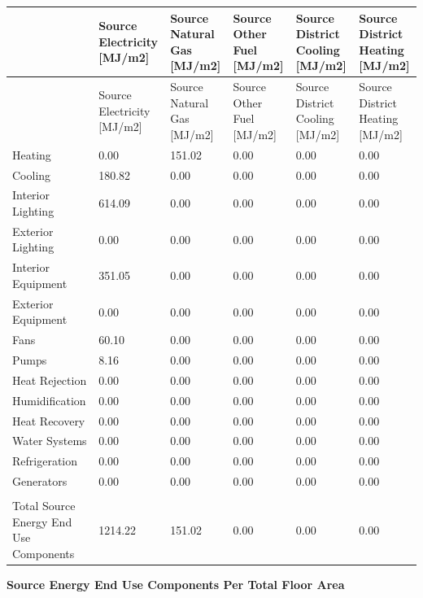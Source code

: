 \begin{longtable}[c]{>{\raggedright}p{1.0in}>{\raggedright}p{1.0in}>{\raggedright}p{1.0in}>{\raggedright}p{1.0in}>{\raggedright}p{1.0in}>{\raggedright}p{1.0in}}
\toprule
 & Source Electricity [MJ/m2] & Source Natural Gas [MJ/m2] & Source Other Fuel [MJ/m2] & Source District Cooling [MJ/m2] & Source District Heating [MJ/m2] \tabularnewline
\midrule
\endfirsthead

\toprule
 & Source Electricity [MJ/m2] & Source Natural Gas [MJ/m2] & Source Other Fuel [MJ/m2] & Source District Cooling [MJ/m2] & Source District Heating [MJ/m2] \tabularnewline
\midrule
\endhead

Heating & 0.00 & 151.02 & 0.00 & 0.00 & 0.00 \tabularnewline
Cooling & 180.82 & 0.00 & 0.00 & 0.00 & 0.00 \tabularnewline
Interior Lighting & 614.09 & 0.00 & 0.00 & 0.00 & 0.00 \tabularnewline
Exterior Lighting & 0.00 & 0.00 & 0.00 & 0.00 & 0.00 \tabularnewline
Interior Equipment & 351.05 & 0.00 & 0.00 & 0.00 & 0.00 \tabularnewline
Exterior Equipment & 0.00 & 0.00 & 0.00 & 0.00 & 0.00 \tabularnewline
Fans & 60.10 & 0.00 & 0.00 & 0.00 & 0.00 \tabularnewline
Pumps & 8.16 & 0.00 & 0.00 & 0.00 & 0.00 \tabularnewline
Heat Rejection & 0.00 & 0.00 & 0.00 & 0.00 & 0.00 \tabularnewline
Humidification & 0.00 & 0.00 & 0.00 & 0.00 & 0.00 \tabularnewline
Heat Recovery & 0.00 & 0.00 & 0.00 & 0.00 & 0.00 \tabularnewline
Water Systems & 0.00 & 0.00 & 0.00 & 0.00 & 0.00 \tabularnewline
Refrigeration & 0.00 & 0.00 & 0.00 & 0.00 & 0.00 \tabularnewline
Generators & 0.00 & 0.00 & 0.00 & 0.00 & 0.00 \tabularnewline
 &  &  &  &  &  \tabularnewline
Total Source Energy End Use Components & 1214.22 & 151.02 & 0.00 & 0.00 & 0.00 \tabularnewline
\bottomrule
\end{longtable}

\textbf{Source Energy End Use Components Per Total Floor Area}

